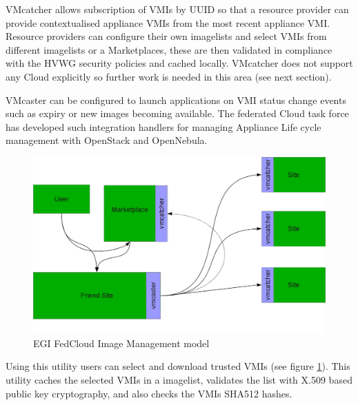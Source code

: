 \documentclass{cai}
\begin{document}
VMcatcher allows subscription of VMIs by UUID so that a resource provider can provide contextualised appliance VMIs from the most recent appliance VMI. Resource providers can configure their own imagelists and select VMIs from different imagelists or a Marketplaces, these are then validated in compliance with the HVWG security policies and cached locally. 
VMcatcher does not support any Cloud explicitly so further work is needed in this area (see next section).

VMcaster can be configured to launch applications on VMI status change events such as expiry or new images becoming available. The federated Cloud task force has developed such integration handlers for managing Appliance Life cycle management with OpenStack and OpenNebula.
\begin{figure}
\centering
\includegraphics[width=1\textwidth]{egi_model.png}
\caption{EGI FedCloud Image Management model}
\label{fig:egimodel}
\end{figure}

Using this utility users can select and download trusted VMIs (see figure \ref{fig:egimodel}).
This utility caches the selected VMIs in a imagelist, validates the list with X.509 based public key cryptography, and also checks the VMIs SHA512 hashes. 
\end{document}
